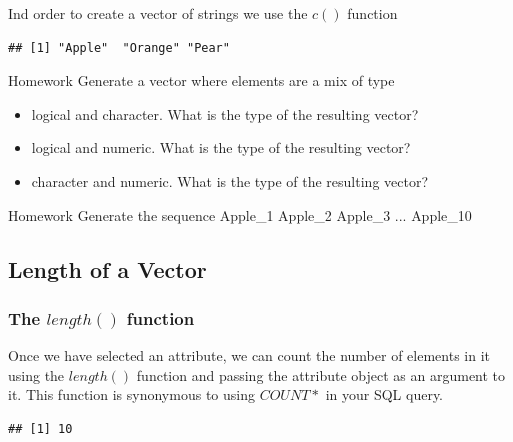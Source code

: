 \documentclass[12pt]{book}\usepackage{knitr}
\begin{document}
\noindent Ind order to create a vector of strings we use the $c()$ function
\begin{knitrout}
\color{fgcolor}\begin{kframe}
\begin{alltt}
\hlkwb{<-} \hlstd{(}\hlstd{,}\hlstd{,}\hlstd{)} 
\end{alltt}
\begin{verbatim}
## [1] "Apple"  "Orange" "Pear"
\end{verbatim}
\end{kframe}
\end{knitrout}

\begin{DIY}{Homework}
Generate a vector where elements are a mix of type
\begin{itemize}
  \item logical and character. What is the type of the resulting vector?
  \item logical and numeric. What is the type of the resulting vector?
  \item character and numeric. What is the type of the resulting vector?
\end{itemize}
\end{DIY}

\begin{DIY}{Homework}
Generate the sequence Apple\_1 Apple\_2 Apple\_3 ... Apple\_10
\end{DIY}

\subsection{Length of a Vector}
\subsubsection{The $length()$ function}
\noindent Once we have selected an attribute, we can count the number of elements in it using the $length()$  function and passing the attribute object as an argument to it. This function is synonymous to using $COUNT*$ in your SQL query.
\begin{knitrout}
\color{fgcolor}\begin{kframe}
\begin{alltt}
 \hlkwb{<-} \hlstd{(}\hlstd{,}\hlstd{)} 
 
\end{alltt}
\begin{verbatim}
## [1] 10
\end{verbatim}
\end{kframe}
\end{knitrout}
\end{document}

